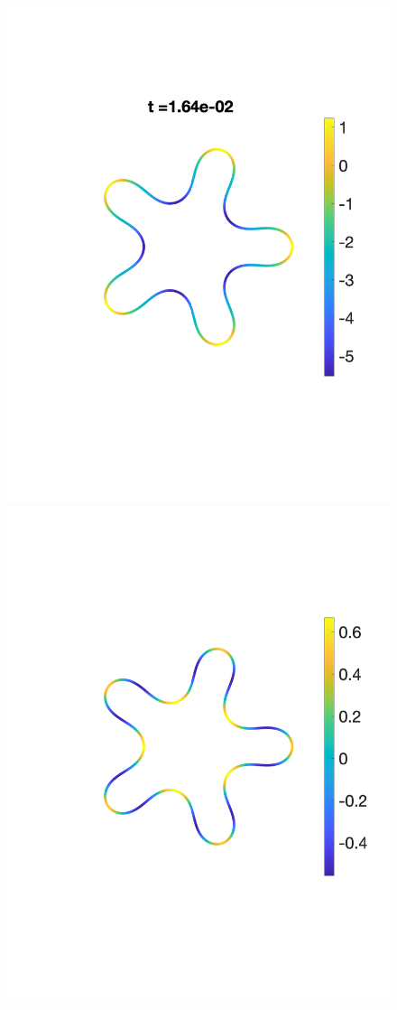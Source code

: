 \documentclass[9pt,twocolumn,twoside,lineno]{pnas-new}
\begin{document}
\begin{figure}[htp]
  \includegraphics[width=0.48\linewidth,trim =2cm 5cm 0cm 5cm, clip=true]{figures/StarTensionTime2.pdf}
  \includegraphics[width=0.48\linewidth,trim =2cm 5cm 0cm 5cm, clip=true]{figures/StarFluxTime2.pdf}


\end{figure}
\end{document}

